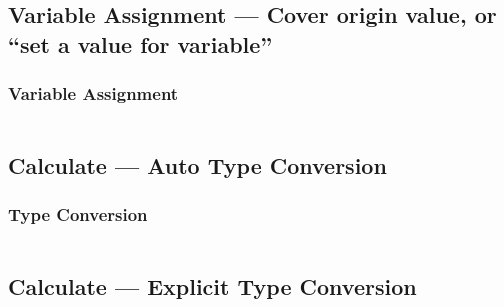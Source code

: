 \documentclass[
  11pt, %
  xcolor=dvipsnames
]{beamer}
\begin{document}

\subsection{Variable Assignment --- Cover origin value, or ``set a value for variable''}
\begin{frame}[fragile]
	\frametitle{Variable Assignment}


	\begin{columns}[c]
		\begin{column}{0.9\textwidth}


		\end{column}
	\end{columns}

\end{frame}

\subsection{Calculate --- Auto Type Conversion}
\begin{frame}[fragile]
	\frametitle{Type Conversion}


	\begin{columns}[c]
		\begin{column}{0.9\textwidth}


		\end{column}
	\end{columns}

\end{frame}

\subsection{Calculate --- Explicit Type Conversion}
\begin{frame}[fragile]

	\begin{columns}[c]
		\begin{column}{0.9\textwidth}


		\end{column}
	\end{columns}

\end{frame}
\end{document}
